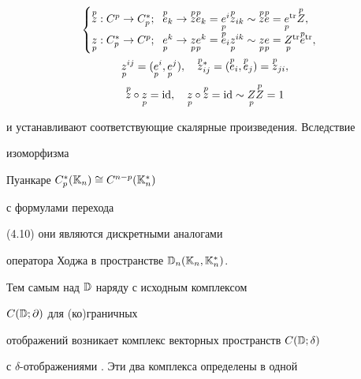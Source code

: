 \begin{gather} 


\begin{cases} 


\up{p}{z}:C^p\to C^*_p;\ \; \up{p}{e}_k\to\up{p}{z} 


\up{p}{e}_k=\down{p}{e}^i\up{p}{z}_{ik}\sim\up{p}{z}\up{p}{e}= 


\down{p}{e}{}^{\tr}\up{p}{Z},\\ 


% 


\down{p}{z}:C^*_p\to C^p;\ \; \down{p}{e}^k\to\down{p}{z} 


\down{p}{e}{}^k=\up{p}{e}_i\down{p}{z}{}^{ik}\sim\down{p}{z} 


\down{p}{e}= 


\down{p}{Z}{}^{\tr}\up{p}{e}{}^{\tr},


\end{cases} 


\\ 


\down{p}{z}{}^{ij}=(\down{p}{e}{}^i,\down{p}{e}{}^j),\quad 


\up{p}{z}{}^*_{ij}=(\up{p}{e}_i,\up{p}{e}_j)=\up{p}{z}_{ji},\notag\\ 


% 


\up{p}{z}\circ\down{p}{z}=\id,\quad \down{p}{z}\circ 


\up{p}{z}=\id\sim\down{p}{Z}\up{p}{Z}=1\notag 


\end{gather} 


и устанавливают соответствующие скалярные произведения. Вследствие 


изоморфизма 


Пуанкаре $C^*_p(\Bbb K_n)\cong C^{n-p}(\Bbb K^*_n)$ 


с формулами перехода 


(4.10) они являются дискретными аналогами 


оператора Ходжа в пространстве $\Bbb D_n(\Bbb K_n,\Bbb K^*_n)$. 


 


Тем самым над $\Bbb D$ наряду с исходным комплексом 


$C(\Bbb D;\partial)$ для (ко)граничных  


отображений возникает комплекс векторных пространств $C(\Bbb D;\delta)$ 


с $\delta$-отображениями \cite{2}. Эти два комплекса определены в одной 


